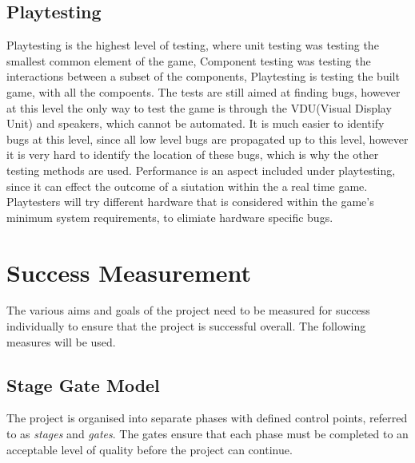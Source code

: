 \subsection{Playtesting}



Playtesting is the highest level of testing, where unit testing was testing the smallest common element of the game, Component testing was testing the interactions between a subset of the components, Playtesting is testing the built game, with all the compoents.
The tests are still aimed at finding bugs, however at this level the only way to test the game is through the VDU(Visual Display Unit) and speakers, which cannot be automated.
It is much easier to identify bugs at this level, since all low level bugs are propagated up to this level, however it is very hard to identify the location of these bugs, which is why the other testing methods are used.
Performance is an aspect included under playtesting, since it can effect the outcome of a siutation within the a real time game.
Playtesters will try different hardware that is considered within the game's minimum system requirements,  to elimiate hardware specific bugs.



\section{Success Measurement}
\label{section:success}

The various aims and goals of the project need to be measured for success individually to ensure that the project is successful overall. The following measures will be used.

\subsection{Stage Gate Model}

The project is organised into separate phases with defined control points, referred to as \emph{stages} and \emph{gates}. The gates ensure that each phase must be completed to an acceptable level of quality before the project can continue.

